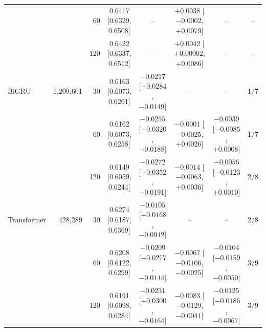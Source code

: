 \begin{table}[t]
\begin{tabular}{@{}lrrccccc@{}}
 & & 60 & 0.6417 [0.6329, 0.6508] & -- & $+0.0038$ [$-0.0002$, $+0.0079$] & -- & -- \\
 & & 120 & 0.6422 [0.6337, 0.6512] & -- & $+0.0042$ [$+0.00002$, $+0.0086$] & -- & -- \\
\midrule
BiGRU & 1,209,601 & 30 & 0.6163 [0.6073, 0.6261] & $-0.0217$ [$-0.0284$, $-0.0149$] & -- & -- & 1/7 \\
 & & 60 & 0.6162 [0.6073, 0.6258] & $-0.0255$ [$-0.0320$, $-0.0188$] & $-0.0001$ [$-0.0025$, $+0.0026$] & $-0.0039$ [$-0.0085$, $+0.0008$] & 1/7 \\
 & & 120 & 0.6149 [0.6059, 0.6244] & $-0.0272$ [$-0.0352$, $-0.0191$] & $-0.0014$ [$-0.0063$, $+0.0036$] & $-0.0056$ [$-0.0123$, $+0.0010$] & 2/8 \\
\midrule
Transformer & 428,289 & 30 & 0.6274 [0.6187, 0.6369] & $-0.0105$ [$-0.0168$, $-0.0042$] & -- & -- & 2/8 \\
 & & 60 & 0.6208 [0.6122, 0.6299] & $-0.0209$ [$-0.0277$, $-0.0144$] & $-0.0067$ [$-0.0106$, $-0.0025$] & $-0.0104$ [$-0.0159$, $-0.0050$] & 3/9 \\
 & & 120 & 0.6191 [0.6098, 0.6284] & $-0.0231$ [$-0.0300$, $-0.0164$] & $-0.0083$ [$-0.0129$, $-0.0041$] & $-0.0125$ [$-0.0186$, $-0.0067$] & 3/9 \\
\bottomrule
\end{tabular}
\end{table}


